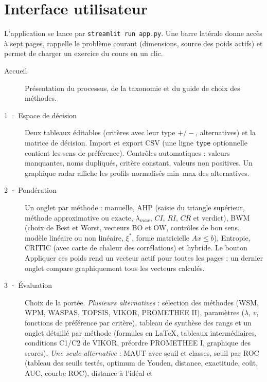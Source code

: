 \documentclass[11pt,a4paper]{report}
\theoremstyle{definition}
\theoremstyle{remark}
\begin{document}
\chapter{Interface utilisateur}\label{ch:interface}

L'application se lance par \texttt{streamlit run app.py}. Une barre latérale donne accès à sept pages,
rappelle le problème courant (dimensions, source des poids actifs) et permet de charger un exercice du cours
en un clic.

\begin{description}
  \item[Accueil] Présentation du processus, de la taxonomie et du guide de choix des méthodes.
  \item[1 · Espace de décision] Deux tableaux éditables (critères avec leur type $+/-$, alternatives) et la
        matrice de décision. Import et export CSV (une ligne \texttt{type} optionnelle contient les sens de
        préférence). Contrôles automatiques : valeurs manquantes, noms dupliqués, critère constant, valeurs
        non positives. Un graphique radar affiche les profils normalisés min--max des alternatives.
  \item[2 · Pondération] Un onglet par méthode : manuelle, AHP (saisie du triangle supérieur, méthode
        approximative ou exacte, $\lambda_{max}$, $CI$, $RI$, $CR$ et verdict), BWM (choix de Best et Worst,
        vecteurs BO et OW, contrôles de bon sens, modèle linéaire ou non linéaire, $\xi^*$, forme matricielle
        $Ax\le b$), Entropie, CRITIC (avec carte de chaleur des corrélations) et hybride. Le bouton
        \og Appliquer ces poids \fg{} rend un vecteur actif pour toutes les pages ; un dernier onglet
        compare graphiquement tous les vecteurs calculés.
  \item[3 · Évaluation] Choix de la portée. \emph{Plusieurs alternatives} : sélection des méthodes (WSM,
        WPM, WASPAS, TOPSIS, VIKOR, PROMETHEE II), paramètres ($\lambda$, $v$, fonctions de préférence par
        critère), tableau de synthèse des rangs et un onglet détaillé par méthode (formules en
        \LaTeX, tableaux intermédiaires, conditions C1/C2 de VIKOR, préordre PROMETHEE I, graphique des
        scores). \emph{Une seule alternative} : MAUT avec seuil et classes, seuil par ROC (tableau des seuils
        testés, optimum de Youden, distance, exactitude, coût, AUC, courbe ROC), distance à l'idéal et

\end{description}
\end{document}
